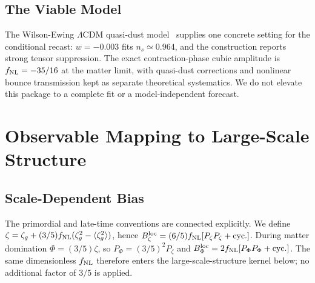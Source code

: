 \documentclass[aps,prd,twocolumn,superscriptaddress,showpacs,preprintnumbers,nofootinbib,longbibliography,floatfix]{revtex4-2}
\newcommand{\fnl}{f_{\rm NL}}
\begin{document}
\subsection{The Viable Model}

The Wilson-Ewing $\Lambda$CDM quasi-dust model~\cite{WilsonEwing:2012} supplies one concrete setting for the conditional recast: $w=-0.003$ fits $n_s\simeq0.964$, and the construction reports strong tensor suppression. The exact contraction-phase cubic amplitude is $\fnl=-35/16$ at the matter limit, with quasi-dust corrections and nonlinear bounce transmission kept as separate theoretical systematics. We do not elevate this package to a complete fit or a model-independent forecast.

\section{Observable Mapping to Large-Scale Structure}
\label{sec:lss}

\subsection{Scale-Dependent Bias}

The primordial and late-time conventions are connected explicitly. We define $\zeta=\zeta_g+(3/5)\fnl(\zeta_g^2-\langle\zeta_g^2\rangle)$, hence $B_\zeta^{\rm loc}=(6/5)\fnl[P_\zeta P_\zeta+{\rm cyc.}]$. During matter domination $\Phi=(3/5)\zeta$, so $P_\Phi=(3/5)^2P_\zeta$ and $B_\Phi^{\rm loc}=2\fnl[P_\Phi P_\Phi+{\rm cyc.}]$. The same dimensionless $\fnl$ therefore enters the large-scale-structure kernel below; no additional factor of $3/5$ is applied.
\end{document}
